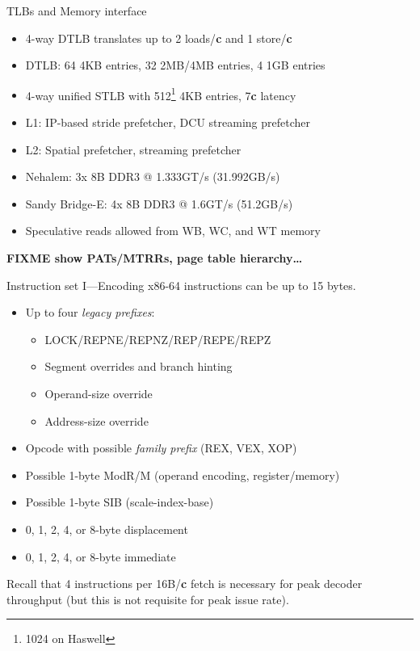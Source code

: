 \documentclass[mathserif,xcolor={dvipsnames,table}]{beamer}
\begin{document}
\begin{frame}{TLBs and Memory interface}
\begin{itemize}
\item 4-way DTLB translates up to 2 loads/\textbf{c} and 1 store/\textbf{c}
\item DTLB: 64 4KB entries, 32 2MB/4MB entries, 4 1GB entries
\item 4-way unified STLB with 512\footnote{1024 on Haswell} 4KB entries, 7\textbf{c} latency
\item L1: IP-based stride prefetcher, DCU streaming prefetcher
\item L2: Spatial prefetcher, streaming prefetcher
\item Nehalem: 3x 8B DDR3 @ 1.333GT/s (31.992GB/s)
\item Sandy Bridge-E: 4x 8B DDR3 @ 1.6GT/s (51.2GB/s)
\item Speculative reads allowed from WB, WC, and WT memory
\end{itemize}
\textbf{FIXME show PATs/MTRRs, page table hierarchy\ldots}
\end{frame}

\begin{frame}{Instruction set I---Encoding}
x86-64 instructions can be up to 15 bytes.
\vfill
\begin{itemize}
\item Up to four \textit{legacy prefixes}:
\begin{itemize}
\item{LOCK/REPNE/REPNZ/REP/REPE/REPZ}
\item{Segment overrides and branch hinting}
\item{Operand-size override}
\item{Address-size override}
\end{itemize}
\item Opcode with possible \textit{family prefix} (REX, VEX, XOP)
\item Possible 1-byte ModR/M (operand encoding, register/memory)
\item Possible 1-byte SIB (scale-index-base)
\item 0, 1, 2, 4, or 8-byte displacement
\item 0, 1, 2, 4, or 8-byte immediate
\end{itemize}
\vfill
Recall that 4 instructions per 16B/\textbf{c} fetch is necessary for peak
decoder throughput (but this is not requisite for peak issue rate).
\end{frame}
\end{document}
